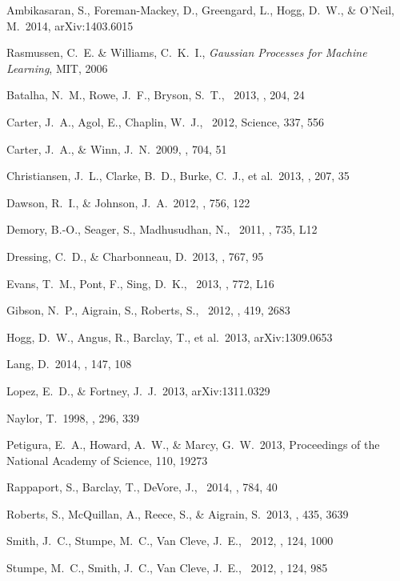 \documentclass[letterpaper,12pt,preprint]{hack_aastex}
\begin{document}
\clearpage
\begin{thebibliography}{}\raggedright%

Ambikasaran, S., Foreman-Mackey, D., Greengard, L., Hogg, D.~W.,
\& O'Neil, M.\ 2014, arXiv:1403.6015

Rasmussen, C.~E. \& Williams, C.~K.~I.,
\emph{Gaussian Processes for Machine Learning}, MIT, 2006

 Batalha, N.~M., Rowe,
J.~F., Bryson, S.~T., \etal\ 2013, \apjs, 204, 24

 Carter, J.~A., Agol, E.,
Chaplin, W.~J., \etal\ 2012, Science, 337, 556

Carter, J.~A., \& Winn, J.~N.\ 2009, \apj, 704, 51

Christiansen, J.~L., Clarke, B.~D., Burke, C.~J., et al.\ 2013, \apjs, 207, 35

Dawson, R.~I., \& Johnson, J.~A.\ 2012, \apj, 756, 122

 Demory, B.-O., Seager,
S., Madhusudhan, N., \etal\ 2011, \apjl, 735, L12

Dressing, C.~D., \& Charbonneau, D.\ 2013, \apj, 767, 95

 Evans, T.~M., Pont, F.,
Sing, D.~K., \etal\ 2013, \apjl, 772, L16

Gibson, N.~P., Aigrain, S., Roberts, S., \etal\ 2012, \mnras, 419, 2683

 Hogg, D.~W., Angus, R.,
Barclay, T., et al.\ 2013, arXiv:1309.0653

 Lang, D.\ 2014, \aj, 147, 108

Lopez, E.~D., \& Fortney, J.~J.\ 2013, arXiv:1311.0329

 Naylor, T.\ 1998, \mnras, 296,
339

Petigura, E.~A., Howard, A.~W., \& Marcy, G.~W.\ 2013,
Proceedings of the National Academy of Science, 110, 19273

Rappaport, S., Barclay, T., DeVore, J., \etal\ 2014, \apj, 784, 40

 Roberts, S., McQuillan,
A., Reece, S., \& Aigrain, S.\ 2013, \mnras, 435, 3639

 Smith, J.~C., Stumpe,
M.~C., Van Cleve, J.~E., \etal\ 2012, \pasp, 124, 1000

 Stumpe, M.~C., Smith,
J.~C., Van Cleve, J.~E., \etal\ 2012, \pasp, 124, 985

\end{thebibliography}
\end{document}
